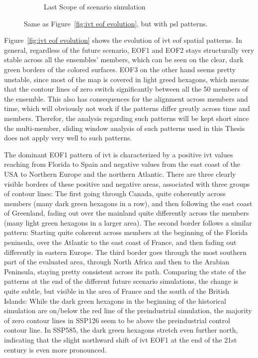 \begin{figure}[!thbp]
\begin{subfigure}[b]{.49\textwidth}
    \caption{Last Scope of scenario simulation}
    \label{fig:psl spatial patterns endscenario}
  \end{subfigure}
  \caption[PSL Spatial Modes Evolution]{Same as Figure~\ref{fig:ivt eof evolution}, but with \ac{psl} patterns.}\label{fig:psl eof evolution}
\end{figure}

Figure~\ref{fig:ivt eof evolution} shows the evolution of \ac{ivt} \ac{eof} spatial patterns. 
In general, regardless of the future scenario, EOF1 and EOF2 stays structurally very stable across all the ensembles' members, which can be seen on the clear, dark green borders of the colored surfaces. 
EOF3 on the other hand seems pretty unstable, since most of the map is covered in light greed hexagons, which means that the contour lines of zero switch significantly between all the 50 members of the ensemble. 
This also has consequences for the alignment across members and time, which will obviously not work if the patterns differ greatly across time and members. 
Therefor, the analysis regarding such patterns will be kept short since the multi-member, sliding window analysis of such patterns used in this Thesis does not apply very well to such patterns. 

The dominant EOF1 pattern of \ac{ivt} is characterized by a positive \ac{ivt} values reaching from Florida to Spain and negative values from the east coast of the USA to Northern Europe and the northern Atlantic. 
There are three clearly visible borders of these positive and negative areas, associated with three groups of contour lines: The first going through Canada, quite coherently across members (many dark green hexagons in a row), and then following the east coast of Greenland, fading out over the mainland quite differently across the members (many light green hexagons in a larger area). 
The second border follows a similar pattern: Starting quite coherent across members at the beginning of the Florida peninsula, over the Atlantic to the east coast of France, and then fading out differently in eastern Europe. 
The third border goes through the most southern part of the evaluated area, through North Africa and then to the Arabian Peninsula, staying pretty consistent across its path. 
Comparing the state of the patterns at the end of the different future scenario simulations, the change is quite subtle, but visible in the area of France and the south of the British Islands:
While the dark green hexagons in the beginning of the historical simulation are on/below the red line of the preindustrial simulation, the majority of zero contour lines in SSP126 seem to be above the preindustrial control contour line. 
In SSP585, the dark green hexagons stretch even further north, indicating that the slight northward shift of \ac{ivt} EOF1 at the end of the 21st century is even more pronounced. 

